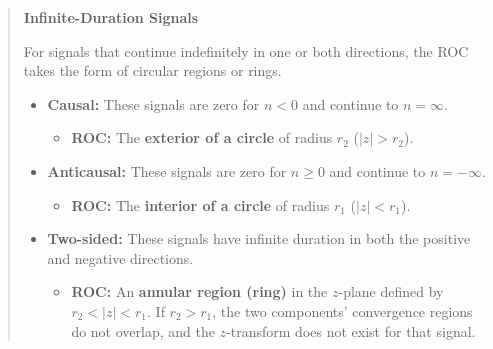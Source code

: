 \begin{quote}
\textbf{Infinite-Duration Signals}

For signals that continue indefinitely in one or both directions, the
ROC takes the form of circular regions or rings.

\begin{itemize}
\tightlist
\item
  \textbf{Causal:} These signals are zero for \(n < 0\) and continue to
  \(n = \infty\).

  \begin{itemize}
  \tightlist
  \item
    \textbf{ROC:} The \textbf{exterior of a circle} of radius \(r_2\)
    (\(|z| > r_2\)).
  \end{itemize}
\item
  \textbf{Anticausal:} These signals are zero for \(n \ge 0\) and
  continue to \(n = -\infty\).

  \begin{itemize}
  \tightlist
  \item
    \textbf{ROC:} The \textbf{interior of a circle} of radius \(r_1\)
    (\(|z| < r_1\)).
  \end{itemize}
\item
  \textbf{Two-sided:} These signals have infinite duration in both the
  positive and negative directions.

  \begin{itemize}
  \tightlist
  \item
    \textbf{ROC:} An \textbf{annular region (ring)} in the \(z\)-plane
    defined by \(r_2 < |z| < r_1\). If \(r_2 > r_1\), the two
    components' convergence regions do not overlap, and the
    \(z\)-transform does not exist for that signal.
  \end{itemize}
\end{itemize}
\end{quote}

